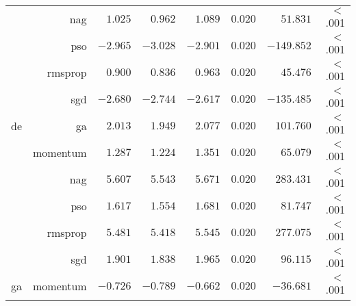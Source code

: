 \begin{table}[htbp]
{\begin{tabular}{lrrrrrrr}
			                     & nag                  & $1.025$              & $0.962$                                         & $1.089$              & $0.020$              & $51.831$             & $<$ .001    \\
			                     & pso                  & $-2.965$             & $-3.028$                                        & $-2.901$             & $0.020$              & $-149.852$           & $<$ .001    \\
			                     & rmsprop              & $0.900$              & $0.836$                                         & $0.963$              & $0.020$              & $45.476$             & $<$ .001    \\
			                     & sgd                  & $-2.680$             & $-2.744$                                        & $-2.617$             & $0.020$              & $-135.485$           & $<$ .001    \\
			de                   & ga                   & $2.013$              & $1.949$                                         & $2.077$              & $0.020$              & $101.760$            & $<$ .001    \\
			$ $                  & momentum             & $1.287$              & $1.224$                                         & $1.351$              & $0.020$              & $65.079$             & $<$ .001    \\
			                     & nag                  & $5.607$              & $5.543$                                         & $5.671$              & $0.020$              & $283.431$            & $<$ .001    \\
			                     & pso                  & $1.617$              & $1.554$                                         & $1.681$              & $0.020$              & $81.747$             & $<$ .001    \\
			                     & rmsprop              & $5.481$              & $5.418$                                         & $5.545$              & $0.020$              & $277.075$            & $<$ .001    \\
			                     & sgd                  & $1.901$              & $1.838$                                         & $1.965$              & $0.020$              & $96.115$             & $<$ .001    \\
			ga                   & momentum             & $-0.726$             & $-0.789$                                        & $-0.662$             & $0.020$              & $-36.681$            & $<$ .001    \\

\end{tabular}}
\end{table}
